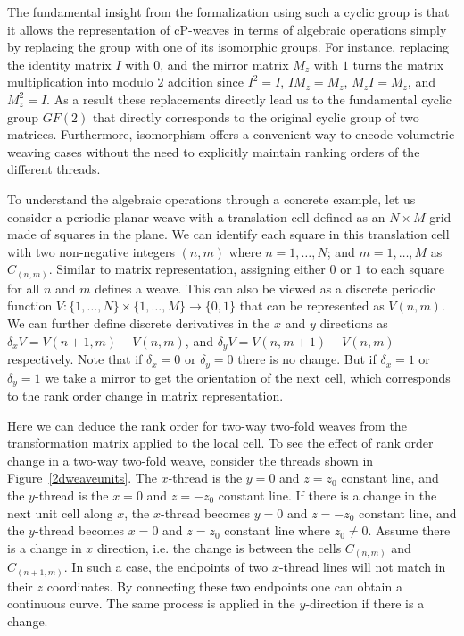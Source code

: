 \documentclass[unnumsec,webpdf,contemporary,large]{oup-authoring-template}%
\theoremstyle{thmstyleone}%
\theoremstyle{thmstyletwo}%
\theoremstyle{thmstylethree}%
\begin{document}
The fundamental insight from the formalization using such a cyclic group is that it allows the representation of cP-weaves in terms of algebraic operations simply by replacing the group with one of its isomorphic groups. For instance, replacing the identity matrix $I$ with $0$, and the mirror matrix $M_z$ with $1$ turns the matrix multiplication into modulo $2$ addition since $I^2 = I$, $I M_z = M_z$, $M_z I = M_z$, and $M^2_z = I$. As a result these replacements directly lead us to the fundamental cyclic group $GF(2)$ that directly corresponds to the original cyclic group of two matrices. Furthermore, isomorphism offers a convenient way to encode volumetric weaving cases without the need to explicitly maintain ranking orders of the different threads.

To understand the algebraic operations through a concrete example, let us consider a periodic planar weave with a translation cell defined as an $N \times M$ grid made of squares in the plane. We can identify each square in this translation cell with two non-negative integers $(n,m)$ where $n=1,\ldots, N$; and $m=1,\ldots, M$ as $C_{(n,m)}$. Similar to matrix representation, assigning either $0$ or $1$ to each square for all $n$ and $m$ defines a weave. This can also be viewed as a discrete periodic function $V: \{1,\ldots,N\} \times \{1,\ldots,M\} \rightarrow \{0,1\}$ that can be represented as $V(n,m)$. We can further define discrete derivatives in the $x$ and $y$ directions as $\delta_x V = V(n+1,m)-V(n,m)$, and $\delta_y V = V(n,m+1)-V(n,m)$ respectively. Note that if $\delta_x=0$ or $\delta_y=0$ there is no change. But if $\delta_x=1$ or $\delta_y=1$ we take a mirror to get the orientation of the next cell, which corresponds to the rank order change in matrix representation. 

Here we can deduce the rank order for two-way two-fold weaves from the transformation matrix applied to the local cell. To see the effect of rank order change in a two-way two-fold weave, consider the threads shown in Figure~\ref{2dweaveunits}. The $x$-thread is the $y=0$ and $z=z_0$ constant line, and the $y$-thread is the $x=0$ and $z=-z_0$ constant line. If there is a change in the next unit cell along $x$, the $x$-thread becomes $y=0$ and $z=-z_0$ constant line, and the $y$-thread becomes $x=0$ and $z=z_0$ constant line where $z_0\neq 0$. Assume there is a change in $x$ direction, i.e. the change is between the cells $C_{(n,m)}$ and $C_{(n+1,m)}$. In such a case, the endpoints of two $x$-thread lines will not match in their $z$ coordinates. By connecting these two endpoints one can obtain a continuous curve. The same process is applied in the $y$-direction if there is a change. 
\end{document}
